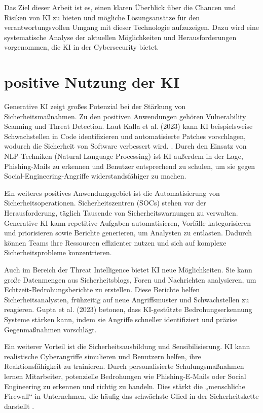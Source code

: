 \documentclass[a4paper,10pt,parskip,twocolumn]{article}
\begin{document}
Das Ziel dieser Arbeit ist es, einen klaren Überblick über die Chancen und Risiken von KI zu bieten und mögliche Lösungsansätze für den verantwortungsvollen Umgang mit dieser Technologie aufzuzeigen. Dazu wird eine systematische Analyse der aktuellen Möglichkeiten und Herausforderungen vorgenommen, die KI in der Cybersecurity bietet.


\section{positive Nutzung der KI}

Generative KI zeigt großes Potenzial bei der Stärkung von Sicherheitsmaßnahmen. Zu den positiven Anwendungen gehören Vulnerability Scanning und Threat Detection. Laut Kalla et al. (2023) kann KI beispielsweise Schwachstellen in Code identifizieren und automatisierte Patches vorschlagen, wodurch die Sicherheit von Software verbessert wird.
. Durch den Einsatz von NLP-Techniken (Natural Language Processing) ist KI außerdem in der Lage, Phishing-Mails zu erkennen und Benutzer entsprechend zu schulen, um sie gegen Social-Engineering-Angriffe widerstandsfähiger zu machen.

Ein weiteres positives Anwendungsgebiet ist die Automatisierung von Sicherheitsoperationen. Sicherheitszentren (SOCs) stehen vor der Herausforderung, täglich Tausende von Sicherheitswarnungen zu verwalten. Generative KI kann repetitive Aufgaben automatisieren, Vorfälle kategorisieren und priorisieren sowie Berichte generieren, um Analysten zu entlasten. Dadurch können Teams ihre Ressourcen effizienter nutzen und sich auf komplexe Sicherheitsprobleme konzentrieren.

Auch im Bereich der Threat Intelligence bietet KI neue Möglichkeiten. Sie kann große Datenmengen aus Sicherheitsblogs, Foren und Nachrichten analysieren, um Echtzeit-Bedrohungsberichte zu erstellen. Diese Berichte helfen Sicherheitsanalysten, frühzeitig auf neue Angriffsmuster und Schwachstellen zu reagieren. Gupta et al. (2023) betonen, dass KI-gestützte Bedrohungserkennung Systeme stärken kann, indem sie Angriffe schneller identifiziert und präzise Gegenmaßnahmen vorschlägt​
.

Ein weiterer Vorteil ist die Sicherheitsausbildung und Sensibilisierung. KI kann realistische Cyberangriffe simulieren und Benutzern helfen, ihre Reaktionsfähigkeit zu trainieren. Durch personalisierte Schulungsmaßnahmen lernen Mitarbeiter, potenzielle Bedrohungen wie Phishing-E-Mails oder Social Engineering zu erkennen und richtig zu handeln. Dies stärkt die „menschliche Firewall“ in Unternehmen, die häufig das schwächste Glied in der Sicherheitskette darstellt​
.
\end{document}

